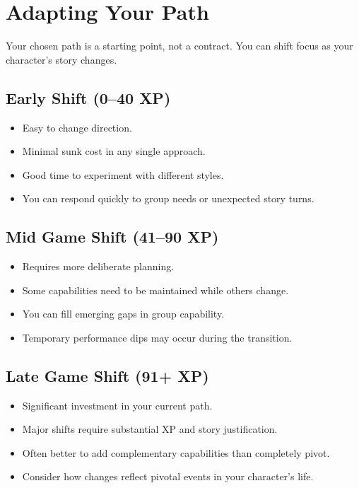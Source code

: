 
\section{Adapting Your Path}
\label{sec:xp-adapting}

Your chosen path is a starting point, not a contract. You can shift focus as
your character's story changes.

\subsection*{Early Shift (0--40 XP)}
\begin{itemize}
\item Easy to change direction.
\item Minimal sunk cost in any single approach.
\item Good time to experiment with different styles.
\item You can respond quickly to group needs or unexpected story turns.
\end{itemize}

\subsection*{Mid Game Shift (41--90 XP)}
\begin{itemize}
\item Requires more deliberate planning.
\item Some capabilities need to be maintained while others change.
\item You can fill emerging gaps in group capability.
\item Temporary performance dips may occur during the transition.
\end{itemize}

\subsection*{Late Game Shift (91+ XP)}
\begin{itemize}
\item Significant investment in your current path.
\item Major shifts require substantial XP and story justification.
\item Often better to add complementary capabilities than completely pivot.
\item Consider how changes reflect pivotal events in your character's life.
\end{itemize}

